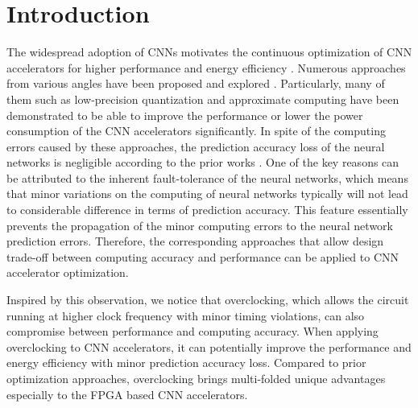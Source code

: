 \section{Introduction} \label{sec:intro}
The widespread adoption of CNNs motivates the 
continuous optimization of CNN accelerators for higher 
performance and energy efficiency
\cite{pipecnn_2,Zhang2015_9,Qiu2016_10,Farabet2010_13,Zeng2018_18}. 
Numerous approaches from various 
angles have been proposed and explored \cite{EIE_han_2016} \cite{deepburing_12}. 
Particularly, many of them such as 
low-precision quantization \cite{Hwang2014_17} \cite{Matthieu2014_8} 
and approximate computing \cite{Approximate_Multiplier_31} \cite{Approximate_32} \cite{approximate_33}
have been demonstrated to 
be able to improve the performance or lower the power consumption of the CNN 
accelerators significantly. In spite of the computing errors caused by these approaches, 
the prediction accuracy loss of the neural networks is negligible according to the prior works \cite{deep_compress_han_2015}.
One of the key reasons can be attributed to the inherent fault-tolerance of 
the neural networks, which means that minor variations on the 
computing of neural networks typically will not lead to considerable 
difference in terms of prediction accuracy. This 
feature essentially prevents the propagation of 
the minor computing errors to the neural network prediction errors. 
Therefore, the corresponding approaches that allow design trade-off 
between computing accuracy and performance can be applied to CNN 
accelerator optimization.

Inspired by this observation, we notice that overclocking, which 
allows the circuit running at higher clock frequency with minor 
timing violations, can also compromise between performance 
and computing accuracy. When applying overclocking to CNN accelerators, 
it can potentially improve the performance and energy 
efficiency with minor prediction accuracy loss.
Compared to prior optimization approaches, overclocking brings 
multi-folded unique advantages especially to the FPGA based CNN 
accelerators. 

